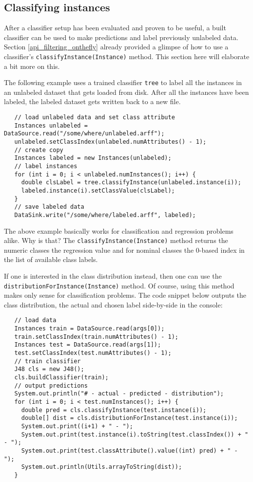 \newpage

\subsection{Classifying instances}
After a classifier setup has been evaluated and proven to be useful, a built
classifier can be used to make predictions and label previously unlabeled data.
Section \ref{api_filtering_onthefly} already provided a glimpse of how to use a
classifier's \texttt{classifyInstance(Instance)} method. This section here will
elaborate a bit more on this.

The following example uses a trained classifier \texttt{tree} to label all the
instances in an unlabeled dataset that gets loaded from disk. After all the
instances have been labeled, the labeled dataset gets written back to a new
file.
\begin{verbatim}
   // load unlabeled data and set class attribute
   Instances unlabeled = DataSource.read("/some/where/unlabeled.arff"); 
   unlabeled.setClassIndex(unlabeled.numAttributes() - 1);
   // create copy
   Instances labeled = new Instances(unlabeled);
   // label instances
   for (int i = 0; i < unlabeled.numInstances(); i++) {
     double clsLabel = tree.classifyInstance(unlabeled.instance(i));
     labeled.instance(i).setClassValue(clsLabel);
   }
   // save labeled data
   DataSink.write("/some/where/labeled.arff", labeled);
\end{verbatim}
The above example basically works for classification and regression problems
alike. Why is that? The \texttt{classifyInstance(Instance)} method returns the
numeric classes the regression value and for nominal classes the 0-based index
in the list of available class labels.

If one is interested in the class distribution instead, then one can use the
\texttt{distributionForInstance(Instance)} method. Of course, using this method
makes only sense for classification problems. The code snippet below outputs
the class distribution, the actual and chosen label side-by-side in the
console:
\begin{verbatim}
   // load data
   Instances train = DataSource.read(args[0]);
   train.setClassIndex(train.numAttributes() - 1);
   Instances test = DataSource.read(args[1]);
   test.setClassIndex(test.numAttributes() - 1);
   // train classifier
   J48 cls = new J48();
   cls.buildClassifier(train);
   // output predictions
   System.out.println("# - actual - predicted - distribution");
   for (int i = 0; i < test.numInstances(); i++) {
     double pred = cls.classifyInstance(test.instance(i));
     double[] dist = cls.distributionForInstance(test.instance(i));
     System.out.print((i+1) + " - ");
     System.out.print(test.instance(i).toString(test.classIndex()) + " - ");
     System.out.print(test.classAttribute().value((int) pred) + " - ");
     System.out.println(Utils.arrayToString(dist));
   }
\end{verbatim}

